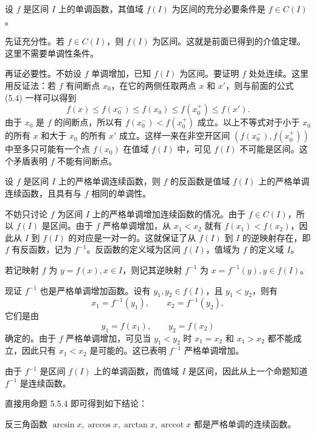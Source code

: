 \begin{xproposition}[5.5.3]
设 $f$ 是区间 $I$ 上的单调函数，其值域 $f(I)$ 为区间的充分必要条件是 $f\in C(I)$。
\end{xproposition}
\begin{xproof}
先证充分性。若 $f\in C(I)$，则 $f(I)$ 为区间。这就是前面已得到的介值定理。这里不需要单调性条件。

再证必要性。不妨设 $f$ 单调增加，已知 $f(I)$ 为区间。要证明 $f$ 处处连续。这里用反证法：若 $f$ 有间断点 $x_0$，在它的两侧任取两点 $x$ 和 $x'$，则与前面的公式 (5.4) 一样可以得到
\[
  f(x)\le f(x_0^-)\le f(x_0)\le f(x_0^+)\le f(x').
\]
由于 $x_0$ 是 $f$ 的间断点，所以有 $f(x_0^-)<f(x_0^+)$ 成立。以上不等式对于小于 $x_0$ 的所有 $x$ 和大于 $x_0$ 的所有 $x'$ 成立。这样一来在非空开区间 $(f(x_0^-),f(x_0^+))$ 中至多只可能有一个点 $f(x_0)$ 在值域 $f(I)$ 中，可见 $f(I)$ 不可能是区间。这个矛盾表明 $f$ 不能有间断点。
\end{xproof}

\begin{xproposition}[5.5.4]
设 $f$ 是区间 $I$ 上的严格单调连续函数，则 $f$ 的反函数是值域 $f(I)$ 上的严格单调连续函数，且具有与 $f$ 相同的单调性。
\end{xproposition}
\begin{xproof}
不妨只讨论 $f$ 为区间 $I$ 上的严格单调增加连续函数的情况。由于 $f\in C(I)$，所以 $f(I)$ 是区间。由于 $f$ 严格单调增加，从 $x_1<x_2$ 就有 $f(x_1)<f(x_2)$，因此从 $I$ 到 $f(I)$ 的对应是一对一的。这就保证了从 $f(I)$ 到 $I$ 的逆映射存在，即 $f$ 有反函数，记为 $f^{-1}$。反函数的定义域为区间 $f(I)$，值域为 $f$ 的定义域 $I$。

若记映射 $f$ 为 $y=f(x),x\in I$，则记其逆映射 $f^{-1}$ 为 $x=f^{-1}(y),y\in f(I)$。

现证 $f^{-1}$ 也是严格单调增加函数。设有 $y_1,y_2\in f(I)$，且 $y_1<y_2$，则有
\[
  x_1=f^{-1}(y_1),\qquad x_2=f^{-1}(y_2),
\]
它们是由
\[
  y_1=f(x_1),\qquad y_2=f(x_2)
\]
确定的。由于 $f$ 严格单调增加，可见当 $y_1<y_2$ 时 $x_1=x_2$ 和 $x_1>x_2$ 都不能成立，因此只有 $x_1<x_2$ 是可能的。这已表明 $f^{-1}$ 严格单调增加。

由于 $f^{-1}$ 是区间 $f(I)$ 上的单调函数，而值域 $I$ 是区间，因此从上一个命题知道 $f^{-1}$ 是连续函数。
\end{xproof}

直接用命题 5.5.4 即可得到如下结论：

\begin{xexample}[5.5.1]
反三角函数 $\arcsin x,\arccos x,\arctan x,\operatorname{arccot}x$ 都是严格单调的连续函数。
\end{xexample}

